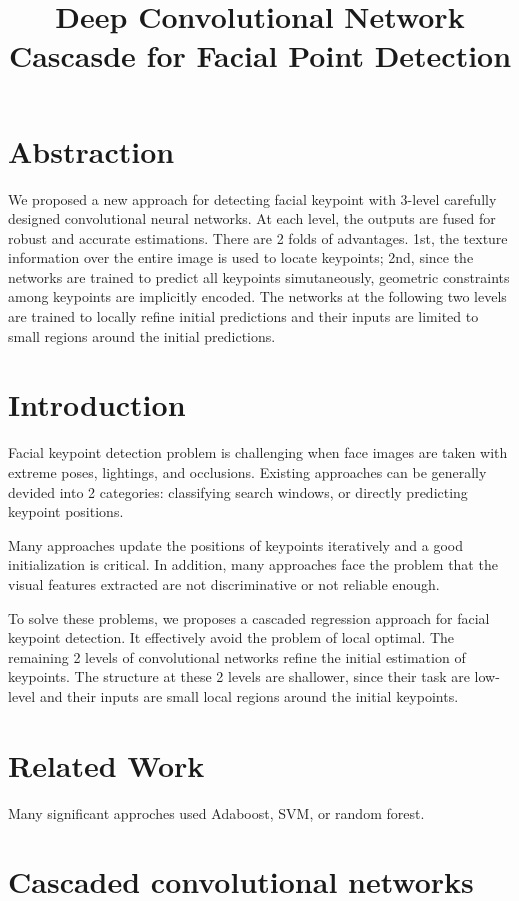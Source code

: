 \documentclass{ctexart}
\begin{document}
\setlength{\parindent}{0pt}

\title{Deep Convolutional Network Cascasde for Facial Point Detection}
\maketitle

\section{Abstraction}

We proposed a new approach for detecting facial keypoint with 3-level carefully designed
convolutional neural networks. At each level, the outputs are fused for robust and accurate
estimations. There are 2 folds of advantages. 1st, the texture information over the entire
image is used to locate keypoints; 2nd, since the networks are trained to predict all keypoints
simutaneously, geometric constraints among keypoints are implicitly encoded.
The networks at the following two levels are trained to locally refine initial predictions and
their inputs are limited to small regions around the initial predictions.

\section{Introduction}

Facial keypoint detection problem is challenging when face images are taken with extreme poses,
lightings, and occlusions. Existing approaches can be generally devided into 2 categories:
classifying search windows, or directly predicting keypoint positions.

Many approaches update the positions of keypoints iteratively and a good initialization is
critical. In addition, many approaches face the problem that the visual features extracted are
not discriminative or not reliable enough.

To solve these problems, we proposes a cascaded regression approach for facial keypoint detection.
It effectively avoid the problem of local optimal. The remaining 2 levels of convolutional networks
refine the initial estimation of keypoints. The structure at these 2 levels are shallower, since
their task are low-level and their inputs are small local regions around the initial keypoints.

\section{Related Work}
Many significant approches used Adaboost, SVM, or random forest.

\section{Cascaded convolutional networks}
\end{document}
